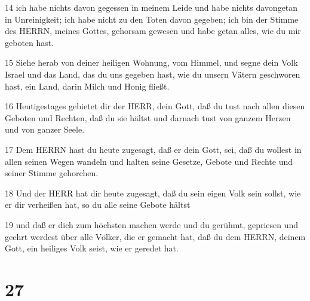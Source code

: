 \par 14 ich habe nichts davon gegessen in meinem Leide und habe nichts davongetan in Unreinigkeit; ich habe nicht zu den Toten davon gegeben; ich bin der Stimme des HERRN, meines Gottes, gehorsam gewesen und habe getan alles, wie du mir geboten hast.
\par 15 Siehe herab von deiner heiligen Wohnung, vom Himmel, und segne dein Volk Israel und das Land, das du uns gegeben hast, wie du unsern Vätern geschworen hast, ein Land, darin Milch und Honig fließt.
\par 16 Heutigestages gebietet dir der HERR, dein Gott, daß du tust nach allen diesen Geboten und Rechten, daß du sie hältst und darnach tust von ganzem Herzen und von ganzer Seele.
\par 17 Dem HERRN hast du heute zugesagt, daß er dein Gott, sei, daß du wollest in allen seinen Wegen wandeln und halten seine Gesetze, Gebote und Rechte und seiner Stimme gehorchen.
\par 18 Und der HERR hat dir heute zugesagt, daß du sein eigen Volk sein sollst, wie er dir verheißen hat, so du alle seine Gebote hältst
\par 19 und daß er dich zum höchsten machen werde und du gerühmt, gepriesen und geehrt werdest über alle Völker, die er gemacht hat, daß du dem HERRN, deinem Gott, ein heiliges Volk seist, wie er geredet hat.

\chapter{27}

